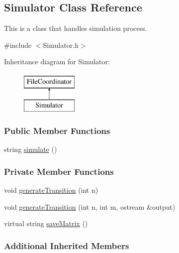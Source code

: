 \hypertarget{class_simulator}{\subsection{Simulator Class Reference}
\label{class_simulator}
}


This is a class that handles simulation process.  




{\ttfamily \#include $<$Simulator.\+h$>$}

Inheritance diagram for Simulator\+:\begin{figure}[H]
\begin{center}
\leavevmode
\includegraphics[height=2.000000cm]{class_simulator}
\end{center}
\end{figure}
\subsubsection*{Public Member Functions}
\begin{DoxyCompactItemize}
\item 
string \hyperlink{class_simulator_a252d919d45b1789b7fa809e8ac6d8c63}{simulate} ()
\end{DoxyCompactItemize}
\subsubsection*{Private Member Functions}
\begin{DoxyCompactItemize}
\item 
void \hyperlink{class_simulator_ab05f5807293d42624526d1f3fe6aab71}{generate\+Transition} (int n)
\item 
void \hyperlink{class_simulator_aced31482cc73fa28ac9067325c9dd185}{generate\+Transition} (int n, int m, ostream \&output)
\item 
virtual string \hyperlink{class_simulator_a1270d2e2eeaa4aa3284e2d74a8644bc3}{save\+Matrix} ()
\end{DoxyCompactItemize}
\subsubsection*{Additional Inherited Members}


